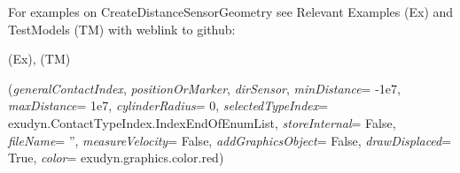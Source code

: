 %
\noindent For examples on CreateDistanceSensorGeometry see Relevant Examples (Ex) and TestModels (TM) with weblink to github:
\bi
 \item \footnotesize {} (Ex), 
 (TM)
\ei

%
\begin{flushleft}
\label{sec:mainsystemextensions:CreateDistanceSensor}
({\it generalContactIndex}, {\it positionOrMarker}, {\it dirSensor}, {\it minDistance}= -1e7, {\it maxDistance}= 1e7, {\it cylinderRadius}= 0, {\it selectedTypeIndex}= exudyn.ContactTypeIndex.IndexEndOfEnumList, {\it storeInternal}= False, {\it fileName}= '', {\it measureVelocity}= False, {\it addGraphicsObject}= False, {\it drawDisplaced}= True, {\it color}= exudyn.graphics.color.red)
\end{flushleft}
\setlength{\itemindent}{0.7cm}
